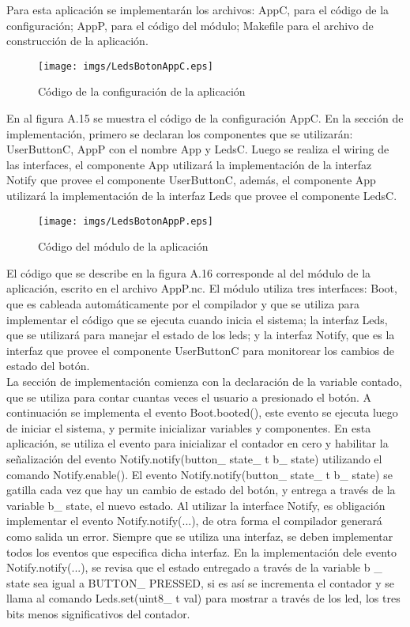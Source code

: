 Para esta aplicación se implementarán los archivos: AppC, para el código de la configuración; AppP, para el código del módulo; Makefile para el archivo de construcción de la aplicación.

\begin{figure}[H]
	\centering
 	\texttt{[image: imgs/LedsBotonAppC.eps]} 
 	\caption{Código de la configuración de la aplicación}
\end{figure}

En al figura A.15 se muestra el código de la configuración AppC.  En la sección de implementación, primero se declaran los componentes que se utilizarán: UserButtonC, AppP con el nombre App y LedsC. Luego se realiza el wiring de las interfaces, el componente App utilizará la implementación de la interfaz Notify que provee el componente UserButtonC, además, el componente App utilizará la implementación de la interfaz Leds que provee el componente LedsC.\\

\begin{figure}[H]
	\centering
 	\texttt{[image: imgs/LedsBotonAppP.eps]} 
 	\caption{Código del módulo de la aplicación}
\end{figure}

El código que se describe en la figura A.16 corresponde al del módulo de la aplicación, escrito en el archivo AppP.nc. El módulo utiliza tres interfaces: Boot, que es cableada automáticamente por el compilador y que se utiliza para implementar el código que se ejecuta cuando inicia el sistema; la interfaz Leds, que se utilizará para manejar el estado de los leds; y la interfaz Notify, que es la interfaz que provee el componente UserButtonC para monitorear los cambios de estado del botón.\\

La sección de implementación comienza con la declaración de la variable contado, que se utiliza para contar cuantas veces el usuario a presionado el botón. A continuación se implementa el evento Boot.booted(), este evento se ejecuta luego de iniciar el sistema, y permite inicializar variables y componentes. En esta aplicación, se utiliza el evento para inicializar el contador en cero y habilitar la señalización del evento Notify.notify(button\_ state\_ t b\_ state) utilizando el comando Notify.enable(). El evento Notify.notify(button\_ state\_ t b\_ state) se gatilla cada vez que hay un cambio de estado del botón, y entrega a través de la variable b\_ state, el nuevo estado. Al utilizar la interface Notify, es obligación implementar el evento Notify.notify(...), de otra forma el compilador generará como salida un error. Siempre que se utiliza una interfaz, se deben implementar todos los eventos que especifica dicha interfaz. En la implementación dele evento Notify.notify(...), se revisa que el estado entregado a través de la variable b \_ state sea igual a BUTTON\_ PRESSED, si es así se incrementa el contador y se llama al comando Leds.set(uint8\_ t val)  para mostrar a través de los led, los tres bits menos significativos del contador.\\

